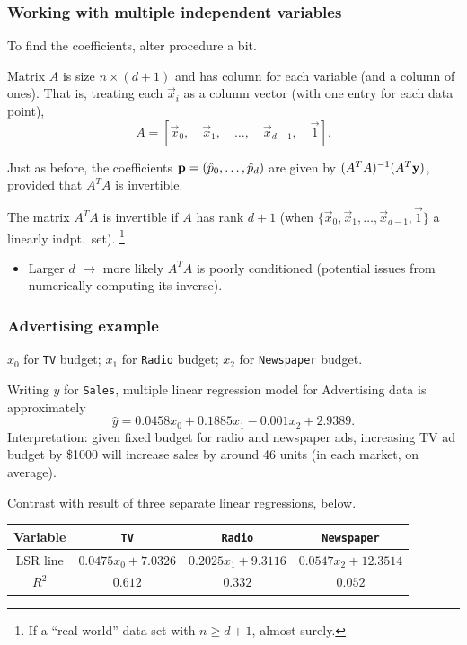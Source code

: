 \documentclass{beamer}
\theoremstyle{example}
\newcommand{\ttt}[1]{{\small\texttt{#1}}}
\begin{document}
\begin{frame}
\frametitle{Working with multiple independent variables}
    To find the coefficients, alter procedure a bit. 
    
    Matrix $A$ is size $n\times(d+1)$ and has column for each variable (and a column of ones). That is, treating each $\vec{x}_i$ as a column vector (with one entry for each data point),
        \[A = \left[\vec{x}_0, \quad\vec{x}_1, \quad\ldots, \quad\vec{x}_{d-1}, \quad\vec{1}\right].\]

    \pause
    Just as before, the coefficients ${\bf p} = (\hat{p}_0,\ldots, \hat{p}_d)$ are given by $(A^TA)^{-1}(A^T{\bf y})$, provided that $A^TA$ is invertible. 

    \pause
    The matrix $A^TA$ is invertible if $A$ has rank $d+1$ (when $\{\vec{x}_0, \vec{x}_1, \ldots, \vec{x}_{d-1}, \vec{1}\}$ a linearly indpt.\ set). \footnote{If a ``real world'' data set with $n\ge d+1$, almost surely.} 
    \pause
    \begin{itemize}
        \item Larger $d$ $\to$ more likely $A^TA$ is poorly conditioned (potential issues from numerically computing its inverse).
    \end{itemize}

\end{frame}

\begin{frame}
    \frametitle{Advertising example}
    $x_0$ for \ttt{TV} budget; \quad $x_1$ for \ttt{Radio} budget; \quad $x_2$ for \ttt{Newspaper} budget.
    
    \pause
    Writing $y$ for \ttt{Sales}, multiple linear regression model for Advertising data is approximately 
        \[\hat{y} = 0.0458x_0 + 0.1885x_1 - 0.001x_2 + 2.9389.\]
    \pause
    Interpretation: given fixed budget for radio and newspaper ads, increasing TV ad budget by \$1000 will increase sales by around 46 units (in each market, on average).

    \pause
    Contrast with result of three separate linear regressions, below.
    
    \begin{center}
        \begin{tabular}{c ||c|c|c}
            Variable & \ttt{TV} & \ttt{Radio} & \ttt{Newspaper} \\ 
            \hline 
            LSR line    &  {\footnotesize$0.0475x_0 + 7.0326$} & {\footnotesize$0.2025x_1 + 9.3116$} & {\footnotesize$0.0547x_2 + 12.3514$} \\
            \hline 
            $R^2$       &  {\footnotesize$0.612$}  &  {\footnotesize$0.332$}  &  {\footnotesize$0.052$}
        \end{tabular}
    \end{center}
\end{frame}
\end{document}
